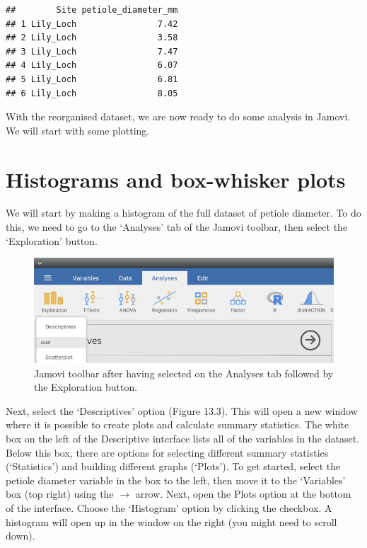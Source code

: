 \documentclass[
]{scrbook}
\begin{document}
\begin{verbatim}
##        Site petiole_diameter_mm
## 1 Lily_Loch                7.42
## 2 Lily_Loch                3.58
## 3 Lily_Loch                7.47
## 4 Lily_Loch                6.07
## 5 Lily_Loch                6.81
## 6 Lily_Loch                8.05
\end{verbatim}

With the reorganised dataset, we are now ready to do some analysis in Jamovi.
We will start with some plotting.

\hypertarget{histograms-and-box-whisker-plots}{%
\section{Histograms and box-whisker plots}\label{histograms-and-box-whisker-plots}}

We will start by making a histogram of the full dataset of petiole diameter.
To do this, we need to go to the `Analyses' tab of the Jamovi toolbar, then select the `Exploration' button.

\begin{figure}
\includegraphics[width=1\linewidth]{img/lilypad_descriptives} \caption{Jamovi toolbar after having selected on the Analyses tab followed by the Exploration button.}\label{fig:unnamed-chunk-50}
\end{figure}

Next, select the `Descriptives' option (Figure 13.3).
This will open a new window where it is possible to create plots and calculate summary statistics.
The white box on the left of the Descriptive interface lists all of the variables in the dataset.
Below this box, there are options for selecting different summary statistics (`Statistics') and building different graphs (`Plots').
To get started, select the petiole diameter variable in the box to the left, then move it to the `Variables' box (top right) using the \(\to\) arrow.
Next, open the Plots option at the bottom of the interface.
Choose the `Histogram' option by clicking the checkbox.
A histogram will open up in the window on the right (you might need to scroll down).
\end{document}
